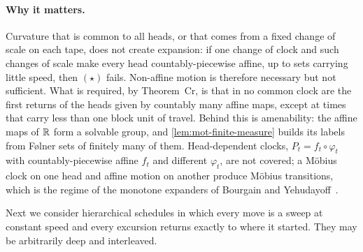 \paragraph{Why it matters.} Curvature that is common to all heads, or that comes from a fixed change of scale
on each tape, does not create expansion: if one change of clock and such changes of scale make every head
countably-piecewise affine, up to sets carrying little speed, then $(\star)$ fails. Non-affine motion is therefore
necessary but not sufficient. What is required, by Theorem~Cr, is that in no common clock are the first returns of the
heads given by countably many affine maps, except at times that carry less than one block unit of travel. Behind this
is amenability: the affine maps of $\mathbb{R}$ form a solvable group, and \cref{lem:mot-finite-measure} builds its labels from
F\o lner sets of finitely many of them. Head-dependent clocks, $P_t=f_t\circ\varphi_t$ with countably-piecewise affine
$f_t$ and different $\varphi_t$, are not covered; a M\"obius clock on one head and affine motion on another produce M\"obius transitions,
which is the regime of the monotone expanders of Bourgain and Yehudayoff~\cite{BourgainYehudayoff2013}.

Next we consider hierarchical schedules in which every move is a sweep at constant speed and every excursion returns
exactly to where it started. They may be arbitrarily deep and interleaved.

